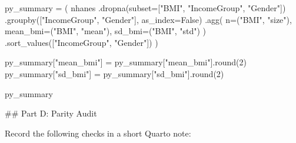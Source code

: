\documentclass[
  letterpaper,
  DIV=11,
  numbers=noendperiod,
  oneside]{scrreprt}
\newenvironment{Shaded}{\begin{snugshade}}{\end{snugshade}}
\newcommand{\BuiltInTok}[1]{\textcolor[rgb]{0.00,0.23,0.31}{#1}}
\newcommand{\DecValTok}[1]{\textcolor[rgb]{0.68,0.00,0.00}{#1}}
\newcommand{\FunctionTok}[1]{\textcolor[rgb]{0.28,0.35,0.67}{#1}}
\newcommand{\InformationTok}[1]{\textcolor[rgb]{0.37,0.37,0.37}{#1}}
\newcommand{\NormalTok}[1]{\textcolor[rgb]{0.00,0.23,0.31}{#1}}
\newcommand{\OperatorTok}[1]{\textcolor[rgb]{0.37,0.37,0.37}{#1}}
\newcommand{\StringTok}[1]{\textcolor[rgb]{0.13,0.47,0.30}{#1}}
\newcommand{\VariableTok}[1]{\textcolor[rgb]{0.07,0.07,0.07}{#1}}
\begin{document}
\begin{Shaded}
\begin{Highlighting}[numbers=left,,]
\NormalTok{py\_summary }\OperatorTok{=}\NormalTok{ (}
\NormalTok{    nhanes}
\NormalTok{    .dropna(subset}\OperatorTok{=}\NormalTok{[}\StringTok{"BMI"}\NormalTok{, }\StringTok{"IncomeGroup"}\NormalTok{, }\StringTok{"Gender"}\NormalTok{])}
\NormalTok{    .groupby([}\StringTok{"IncomeGroup"}\NormalTok{, }\StringTok{"Gender"}\NormalTok{], as\_index}\OperatorTok{=}\VariableTok{False}\NormalTok{)}
\NormalTok{    .agg(}
\NormalTok{        n}\OperatorTok{=}\NormalTok{(}\StringTok{"BMI"}\NormalTok{, }\StringTok{"size"}\NormalTok{),}
\NormalTok{        mean\_bmi}\OperatorTok{=}\NormalTok{(}\StringTok{"BMI"}\NormalTok{, }\StringTok{"mean"}\NormalTok{),}
\NormalTok{        sd\_bmi}\OperatorTok{=}\NormalTok{(}\StringTok{"BMI"}\NormalTok{, }\StringTok{"std"}\NormalTok{)}
\NormalTok{    )}
\NormalTok{    .sort\_values([}\StringTok{"IncomeGroup"}\NormalTok{, }\StringTok{"Gender"}\NormalTok{])}
\NormalTok{)}

\NormalTok{py\_summary[}\StringTok{"mean\_bmi"}\NormalTok{] }\OperatorTok{=}\NormalTok{ py\_summary[}\StringTok{"mean\_bmi"}\NormalTok{].}\BuiltInTok{round}\NormalTok{(}\DecValTok{2}\NormalTok{)}
\NormalTok{py\_summary[}\StringTok{"sd\_bmi"}\NormalTok{] }\OperatorTok{=}\NormalTok{ py\_summary[}\StringTok{"sd\_bmi"}\NormalTok{].}\BuiltInTok{round}\NormalTok{(}\DecValTok{2}\NormalTok{)}

\NormalTok{py\_summary}
\InformationTok{\textasciigrave{}\textasciigrave{}\textasciigrave{}}

\FunctionTok{\#\# Part D: Parity Audit}

\NormalTok{Record the following checks in a short Quarto note:}


\end{Highlighting}
\end{Shaded}
\end{document}

